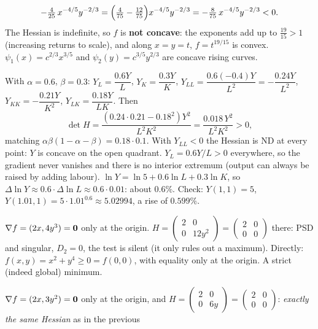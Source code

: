 \begin{solutions}
\[                 -\tfrac{4}{25}\,x^{-4/5}y^{-2/3}
                =\Bigl(\tfrac{4}{75}-\tfrac{12}{75}\Bigr)x^{-4/5}y^{-2/3}
                =-\tfrac{8}{75}\,x^{-4/5}y^{-2/3}<0 .
        \]
        The Hessian is indefinite, so $f$ is \textbf{not concave}: the
        exponents add up to $\tfrac{19}{15}>1$ (increasing returns to
        scale), and along $x=y=t$, $f=t^{19/15}$ is convex.
        $\psi_{1}(x)=c^{2/3}x^{3/5}$ and $\psi_{2}(y)=c^{3/5}y^{2/3}$ are
        concave rising curves.
  \item With $\alpha=0.6$, $\beta=0.3$:
        $Y_{L}=\dfrac{0.6Y}{L}$, $Y_{K}=\dfrac{0.3Y}{K}$,
        $Y_{LL}=\dfrac{0.6(-0.4)Y}{L^{2}}=-\dfrac{0.24Y}{L^{2}}$,
        $Y_{KK}=-\dfrac{0.21Y}{K^{2}}$, $Y_{LK}=\dfrac{0.18Y}{LK}$. Then
        \[
          \det H=\frac{(0.24\cdot0.21-0.18^{2})Y^{2}}{L^{2}K^{2}}
                =\frac{0.018\,Y^{2}}{L^{2}K^{2}}>0,
        \]
        matching $\alpha\beta(1-\alpha-\beta)=0.18\cdot0.1$. With
        $Y_{LL}<0$ the Hessian is ND at every point: $Y$ is concave on the
        open quadrant. $Y_{L}=0.6Y/L>0$ everywhere, so the gradient never
        vanishes and there is no interior extremum (output can always be
        raised by adding labour). $\ln Y=\ln5+0.6\ln L+0.3\ln K$, so
        $\Delta\ln Y\approx0.6\cdot\Delta\ln L\approx0.6\cdot0.01$: about
        $0.6\%$. Check: $Y(1,1)=5$, $Y(1.01,1)=5\cdot1.01^{0.6}\approx
        5.02994$, a rise of $0.599\%$.
  \item $\nabla f=(2x,4y^{3})=\mathbf{0}$ only at the origin.
        $H=\begin{pmatrix}2&0\\0&12y^{2}\end{pmatrix}=\begin{pmatrix}2&0\\
        0&0\end{pmatrix}$ there: PSD and singular, $D_{2}=0$, the test is
        silent (it only rules out a maximum). Directly:
        $f(x,y)=x^{2}+y^{4}\ge0=f(0,0)$, with equality only at the origin.
        A strict (indeed global) minimum.
  \item $\nabla f=(2x,3y^{2})=\mathbf{0}$ only at the origin, and
        $H=\begin{pmatrix}2&0\\0&6y\end{pmatrix}=\begin{pmatrix}2&0\\0&0
        \end{pmatrix}$: \emph{exactly the same Hessian} as in the previous

\end{solutions}

